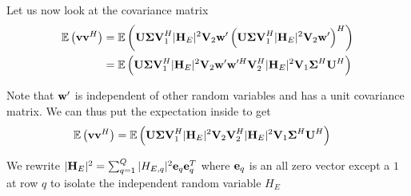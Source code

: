 Let us now look at the covariance matrix
\begin{subequations}
\begin{align}
\mathbb{E}\left(\vect{v}\vect{v}^H\right)&=\mathbb{E}\left(\mat{U} \mat{\Sigma}\mat{V}_1^H |\mat{H}_E|^2 \mat{V}_2 \vect{w}'\left(\mat{U} \mat{\Sigma}\mat{V}_1^H |\mat{H}_E|^2 \mat{V}_2 \vect{w}'\right)^H\right)\\
&=\mathbb{E}\left(\mat{U} \mat{\Sigma}\mat{V}_1^H |\mat{H}_E|^2 \mat{V}_2 \vect{w}'\vect{w}'^H\mat{V}_2^H|\mat{H}_E|^2\mat{V}_1 \mat{\Sigma}^H   \mat{U}^H\right)
\end{align}
\end{subequations}

Note that $\vect{w}'$ is independent of other random variables and has a unit covariance matrix. We can thus put the expectation inside to get
\begin{align}
\mathbb{E}\left(\vect{v}\vect{v}^H\right)&=\mathbb{E}\left(\mat{U} \mat{\Sigma}\mat{V}_1^H |\mat{H}_E|^2 \mat{V}_2 \mat{V}_2^H|\mat{H}_E|^2\mat{V}_1 \mat{\Sigma}^H   \mat{U}^H\right)
\end{align}


We rewrite $|\mat{H}_E|^2=\sum_{q=1}^Q|H_{E,q}|^2 \vect{e}_q \vect{e}_q^T $ where $\vect{e}_q$ is an all zero vector except a $1$ at row $q$ to isolate the independent random variable $H_E$

